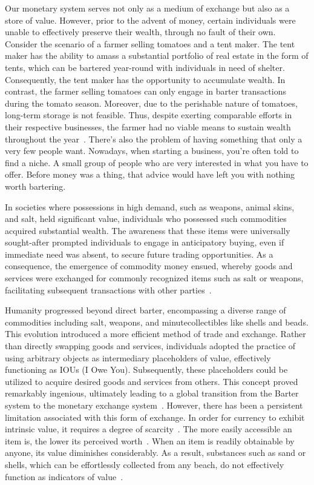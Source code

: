 Our monetary system serves not only as a medium of exchange but also as a store of value. However, prior to the advent
of money, certain individuals were unable to effectively preserve their wealth, through no fault of their own. Consider
the scenario of a farmer selling tomatoes and a tent maker. The tent maker has the ability to amass a substantial
portfolio of real estate in the form of tents, which can be bartered year-round with individuals in need of shelter.
Consequently, the tent maker has the opportunity to accumulate wealth. In contrast, the farmer selling tomatoes can only
engage in barter transactions during the tomato season. Moreover, due to the perishable nature of tomatoes, long-term
storage is not feasible. Thus, despite exerting comparable efforts in their respective businesses, the farmer had no
viable means to sustain wealth throughout the year~\cite{de2016origins}. There's also the problem of having something
that only a very few people want. Nowadays, when starting a business, you're often told to find a niche. A small group
of people who are very interested in what you have to offer. Before money was a thing, that advice would have left you
with nothing worth bartering.

In societies where possessions in high demand, such as weapons, animal skins, and salt, held significant value,
individuals who possessed such commodities acquired substantial wealth. The awareness that these items were universally
sought-after prompted individuals to engage in anticipatory buying, even if immediate need was absent, to secure future
trading opportunities. As a consequence, the emergence of commodity money ensued, whereby goods and services were
exchanged for commonly recognized items such as salt or weapons, facilitating subsequent transactions with other
parties~\cite{polanyi1965trade}.

Humanity progressed beyond direct barter, encompassing a diverse range of commodities including salt, weapons, and
minutecollectibles like shells and beads. This evolution introduced a more efficient method of trade and exchange.
Rather than directly swapping goods and services, individuals adopted the practice of using arbitrary objects as
intermediary placeholders of value, effectively functioning as IOUs (I Owe You). Subsequently, these placeholders could
be utilized to acquire desired goods and services from others. This concept proved remarkably ingenious, ultimately
leading to a global transition from the Barter system to the monetary exchange system~\cite{graeber2012debt}. However,
there has been a persistent limitation associated with this form of exchange. In order for currency to exhibit intrinsic
value, it requires a degree of scarcity~\cite{smith2010wealth, ricardo1821principles}. The more easily accessible an
item is, the lower its perceived worth~\cite{marshall2009principles}. When an item is readily obtainable by anyone, its
value diminishes considerably. As a result, substances such as sand or shells, which can be effortlessly collected from
any beach, do not effectively function as indicators of value~\cite{principlesmenger, hicks1936keynes}.

